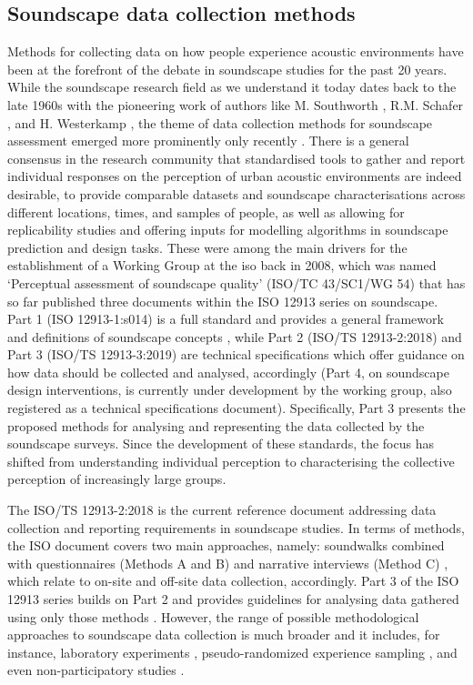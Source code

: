 
\subsection{Soundscape data collection methods}
Methods for collecting data on how people experience acoustic environments have been at the forefront of the debate in soundscape studies for the past 20 years. While the soundscape research field as we understand it today dates back to the late 1960s with the pioneering work of authors like M. Southworth \citep{Southworth1969sonic}, R.M. Schafer \citep{SoundscapeOursonicSchafer}, and H. Westerkamp \citep{Westerkamp2002Linking}, the theme of data collection methods for soundscape assessment emerged more prominently only recently \citep{Kang2016Ten}. There is a general consensus in the research community that standardised tools to gather and report individual responses on the perception of urban acoustic environments are indeed desirable, to provide comparable datasets and soundscape characterisations across different locations, times, and samples of people, as well as allowing for replicability studies and offering inputs for modelling algorithms in soundscape prediction and design tasks. These were among the main drivers for the establishment of a Working Group at the \gls{iso} back in 2008, which was named `Perceptual assessment of soundscape quality' (ISO/TC 43/SC1/WG 54) that has so far published three documents within the ISO 12913 series on soundscape. Part 1 (ISO 12913-1:s014) is a full standard and provides a general framework and definitions of soundscape concepts \citep{ISO12913Part1}, while Part 2 (ISO/TS 12913-2:2018) and Part 3 (ISO/TS 12913-3:2019) are technical specifications which offer guidance on how data should be collected and analysed, accordingly \citep{ISO12913Part2,ISO12913Part3} (Part 4, on soundscape design interventions, is currently under development by the working group, also registered as a technical specifications document). Specifically, Part 3 presents the proposed methods for analysing and representing the data collected by the soundscape surveys. Since the development of these standards, the focus has shifted from understanding individual perception to characterising the collective perception of increasingly large groups.

The ISO/TS 12913-2:2018 is the current reference document addressing data collection and reporting requirements in soundscape studies. In terms of methods, the ISO document covers two main approaches, namely: soundwalks combined with questionnaires (Methods A and B) and narrative interviews (Method C) \citep{ISO12913Part2}, which relate to on-site and off-site data collection, accordingly. Part 3 of the ISO 12913 series builds on Part 2 and provides guidelines for analysing data gathered using only those methods \citep{ISO12913Part3}. However, the range of possible methodological approaches to soundscape data collection is much broader and it includes, for instance, laboratory experiments \citep{Aletta2016Soundscape,Sun2019Classification,Oberman2018Towards}, pseudo-randomized experience sampling \citep{Craig2017Experience}, and even non-participatory studies \citep{Lavia2018Non}. 


